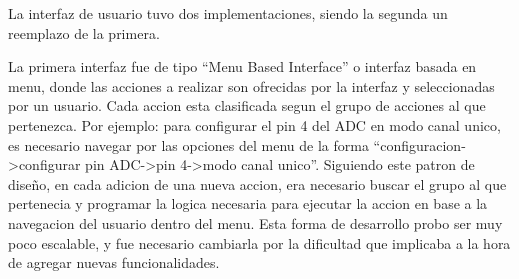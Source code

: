
La interfaz de usuario tuvo dos implementaciones, siendo la segunda un reemplazo de la primera.

La primera interfaz fue de tipo ``Menu Based Interface'' o interfaz basada en menu, donde las acciones a realizar son ofrecidas por la interfaz y seleccionadas por un usuario. Cada accion esta clasificada segun el grupo de acciones al que pertenezca. Por ejemplo: para configurar el pin 4 del ADC en modo canal unico, es necesario navegar por las opciones del menu de la forma ``configuracion->configurar pin ADC->pin 4->modo canal unico''. Siguiendo este patron de diseño, en cada adicion de una nueva accion, era necesario buscar el grupo al que pertenecia y programar la logica necesaria para ejecutar la accion en base a la navegacion del usuario dentro del menu. Esta forma de desarrollo probo ser muy poco escalable, y fue necesario cambiarla por la dificultad que implicaba a la hora de agregar nuevas funcionalidades. \\

